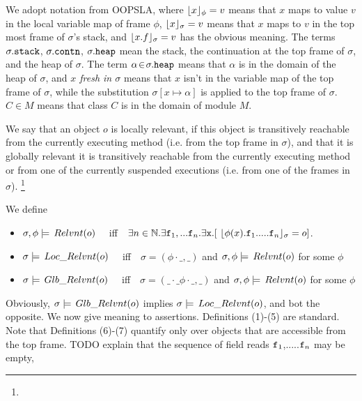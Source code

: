 We adopt notation from OOPSLA, where
 $\lfloor x \rfloor_{\phi} = v$  means that $x$ maps to
value $v$ in the local variable map of frame $\phi$, $\lfloor x \rfloor_{\sigma} = v$ means that $x$ 
maps to $v$ in the top most frame of $\sigma$'s stack, and $\lfloor x.f \rfloor_{\sigma} = v$
has the obvious meaning. The terms $\sigma.{\texttt{stack}}$,  
$\sigma.{\texttt{contn}}$,  
$\sigma.{\texttt{heap}}$     mean the stack, 
the continuation at the
top frame of $\sigma$, %
and the heap of $\sigma$.
The term $\alpha\!\in\!\sigma.{\texttt{heap}}$ means that $\alpha$ is in the domain of the heap of $\sigma$, and \emph{$x$ fresh in $\sigma$} means that 
$x$ isn't in the variable map of the top frame of $\sigma$, 
while the substitution  $\sigma[x \mapsto \alpha]$ is applied to the top frame of $\sigma$.
 \ $C\in M$ means that class $C$ is in the domain of module $M$. 


We say that an object $o$ is locally relevant, if this object is transitively reachable from the currently executing method (i.e. from the top frame in $\sigma$), and that it is globally relevant it is transitively reachable from the currently executing method or from one of the currently suspended executions (i.e. from one of the frames in $\sigma$). \footnote{}

\begin{definition} We define 
\begin{itemize}
\item
$\sigma,\phi \models \,Relvnt(o)$ \ \ iff\ \  
$\exists n\in \mathbb{N}.\exists \prg{f}_1,... \prg{f}_n.\exists \prg{x}.[ \ \interpret{\sigma}{\phi(x).\prg{f}_1.....\prg{f}_n} = o  ]$.
\item
$\sigma \models \,Loc\_Relvnt(o)$ \ \ iff\ \  
$\sigma=(\phi\cdot\_, \_)$ and $\sigma,\phi \models \,Relvnt(o)$ for some $\phi$
\item
$\sigma \models \,Glb\_Relvnt(o)$ \ \ iff\ \  
$\sigma=(\_\cdot\_\phi\cdot\_, \_)$ and $\sigma,\phi \models \,Relvnt(o)$ for some $\phi$
\end{itemize}
\end{definition}

Obviously, $\sigma \models \,Glb\_Relvnt(o)$ implies $\sigma \models \,Loc\_Relvnt(o)$, and bot the opposite.
We now give meaning to assertions. Definitions (1)-(5) are standard. Note that Definitions (6)-(7) quantify only over objects that are accessible from the top frame. TODO  explain that the sequence of field reads ${\texttt{f}}_1$,.....${\texttt{f}}_n$ may be empty,

